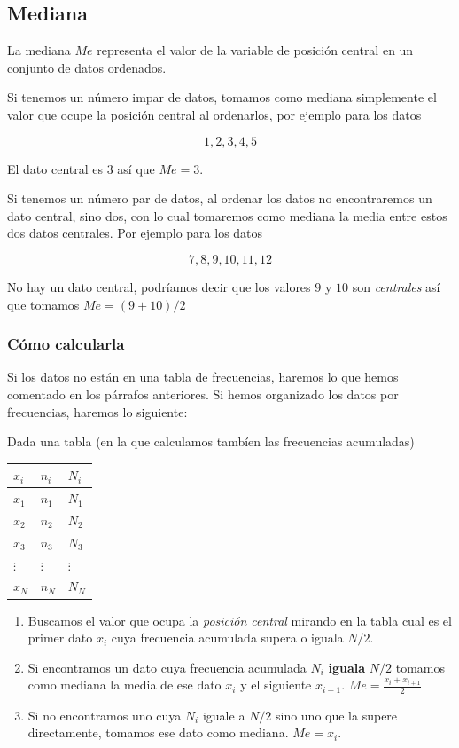 \documentclass[
]{article}
\providecommand{\tightlist}{%
  \setlength{\itemsep}{0pt}\setlength{\parskip}{0pt}}
\begin{document}
\hypertarget{mediana}{%
\subsection{Mediana}\label{mediana}}

La mediana \(Me\) representa el valor de la variable de posición central
en un conjunto de datos ordenados.

Si tenemos un número impar de datos, tomamos como mediana simplemente el
valor que ocupe la posición central al ordenarlos, por ejemplo para los
datos

\[1, 2, 3, 4, 5\]

El dato central es \(3\) así que \(Me = 3\).

Si tenemos un número par de datos, al ordenar los datos no encontraremos
un dato central, sino dos, con lo cual tomaremos como mediana la media
entre estos dos datos centrales. Por ejemplo para los datos

\[7, 8, 9, 10, 11, 12 \]

No hay un dato central, podríamos decir que los valores \(9\) y \(10\)
son \emph{centrales} así que tomamos \(Me= (9+10)/2\)

\hypertarget{cuxf3mo-calcularla-2}{%
\subsubsection{Cómo calcularla}\label{cuxf3mo-calcularla-2}}

Si los datos no están en una tabla de frecuencias, haremos lo que hemos
comentado en los párrafos anteriores. Si hemos organizado los datos por
frecuencias, haremos lo siguiente:

Dada una tabla (en la que calculamos tambíen las frecuencias acumuladas)

\begin{longtable}[]{@{}lll@{}}
\toprule
\(x_i\) & \(n_i\) & \(N_i\)\tabularnewline
\midrule
\endhead
\(x_1\) & \(n_1\) & \(N_1\)\tabularnewline
\(x_2\) & \(n_2\) & \(N_2\)\tabularnewline
\(x_3\) & \(n_3\) & \(N_3\)\tabularnewline
\(\vdots\) & \(\vdots\) & \(\vdots\)\tabularnewline
\(x_N\) & \(n_N\) & \(N_N\)\tabularnewline
\bottomrule
\end{longtable}

\begin{enumerate}
\def\labelenumi{\arabic{enumi}.}
\tightlist
\item
  Buscamos el valor que ocupa la \emph{posición central} mirando en la
  tabla cual es el primer dato \(x_i\) cuya frecuencia acumulada supera
  o iguala \(N/2\).
\item
  Si encontramos un dato cuya frecuencia acumulada \(N_i\)
  \textbf{iguala} \(N/2\) tomamos como mediana la media de ese dato
  \(x_i\) y el siguiente \(x_{i+1}\). \(Me = \frac{x_{i} + x_{i+1}}{2}\)
\item
  Si no encontramos uno cuya \(N_i\) iguale a \(N/2\) sino uno que la
  supere directamente, tomamos ese dato como mediana. \(Me = x_i\).
\end{enumerate}
\end{document}

